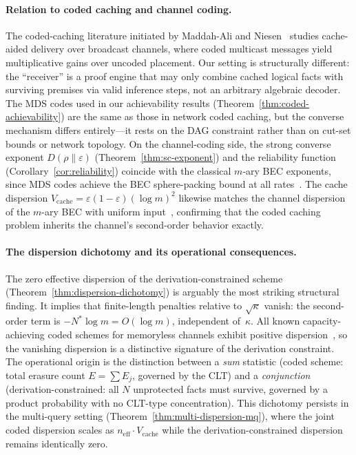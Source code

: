 \documentclass[journal]{IEEEtran}
\numberwithin{equation}{section}
\begin{document}
\paragraph{Relation to coded caching and channel coding.}
The coded-caching literature initiated by Maddah-Ali and
Niesen~\cite{maddah2014fundamental} studies cache-aided
delivery over broadcast channels, where coded multicast
messages yield multiplicative gains over uncoded placement.
Our setting is structurally different: the ``receiver'' is a
proof engine that may only combine cached logical facts with
surviving premises via valid inference steps, not an arbitrary
algebraic decoder.
The MDS codes used in our achievability results
(Theorem~\ref{thm:coded-achievability}) are the same as those
in network coded caching, but the converse mechanism differs
entirely---it rests on the DAG constraint rather than on
cut-set bounds or network topology.
On the channel-coding side, the strong converse exponent
$D(\rho\|\varepsilon)$ (Theorem~\ref{thm:sc-exponent}) and
the reliability function (Corollary~\ref{cor:reliability})
coincide with the classical $m$-ary BEC exponents, since MDS
codes achieve the BEC sphere-packing bound at all
rates~\cite[Theorem~5.8.3]{gallager1968information}.
The cache dispersion
$V_{\mathrm{cache}}=\varepsilon(1{-}\varepsilon)(\log m)^2$
likewise matches the channel dispersion of the $m$-ary BEC
with uniform input~\cite{polyanskiy2010channel}, confirming
that the coded caching problem inherits the channel's
second-order behavior exactly.

\paragraph{The dispersion dichotomy and its operational
  consequences.}
The zero effective dispersion of the derivation-constrained
scheme (Theorem~\ref{thm:dispersion-dichotomy}) is arguably
the most striking structural finding.
It implies that finite-length penalties relative to
$\sqrt\kappa$ vanish: the second-order term is
$-N^*\log m=O(\log m)$, independent of~$\kappa$.
All known capacity-achieving coded schemes for memoryless
channels exhibit positive dispersion~\cite{polyanskiy2010channel},
so the vanishing dispersion is a distinctive signature of the
derivation constraint.
The operational origin is the distinction between a
\emph{sum} statistic (coded scheme: total erasure count
$E=\sum E_j$, governed by the CLT) and a \emph{conjunction}
(derivation-constrained: all $N$ unprotected facts must
survive, governed by a product probability with no
CLT-type concentration).
This dichotomy persists in the multi-query setting
(Theorem~\ref{thm:multi-dispersion-mq}), where the joint
coded dispersion scales as
$n_{\mathrm{eff}}\cdot V_{\mathrm{cache}}$ while the
derivation-constrained dispersion remains identically zero.
\end{document}
